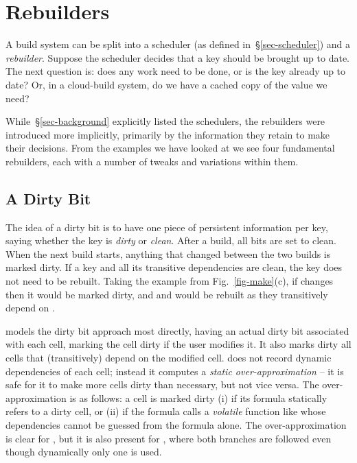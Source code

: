 \section{Rebuilders}\label{sec-rebuilder}

A build system can be split into a scheduler (as defined
in~\S\ref{sec-scheduler}) and a \emph{rebuilder}. Suppose the scheduler decides
that a key should be brought up to date. The next question is: does any work
need to be done, or is the key already up to date? Or, in a cloud-build system,
do we have a cached copy of the value we need?

While~\S\ref{sec-background} explicitly listed the schedulers, the rebuilders
were introduced more implicitly, primarily by the information they retain to
make their decisions. From the examples we have looked at we see four
fundamental rebuilders, each with a number of tweaks and variations within them.

\subsection{A Dirty Bit}\label{sec-dirty-bit}

The idea of a dirty bit is to have one piece of persistent information per key,
saying whether the key is \emph{dirty} or \emph{clean}. After a build, all bits
are set to clean. When the next build starts, anything that changed between the
two builds is marked dirty. If a key and all its transitive dependencies are
clean, the key does not need to be rebuilt. Taking the example from
Fig.~\ref{fig-make}(c), if  changes then it would be marked dirty,
and  and  would be rebuilt as they transitively depend
on .

\Excel models the dirty bit approach most directly, having an actual dirty bit
associated with each cell, marking the cell dirty if the user modifies it.
It also marks dirty all cells that (transitively) depend on the modified cell.
\Excel does not record dynamic dependencies of each cell; instead it computes a
\emph{static over-approximation} -- it is safe for it to make more cells dirty
than necessary, but not vice versa. The over-approximation is as follows: a cell
is marked dirty (i) if its formula statically refers to a dirty cell, or (ii) if
the formula calls a \emph{volatile} function like  whose
dependencies cannot be guessed from the formula alone. The over-approximation is
clear for , but it is also present for , where both
branches are followed even though dynamically only one is used.

